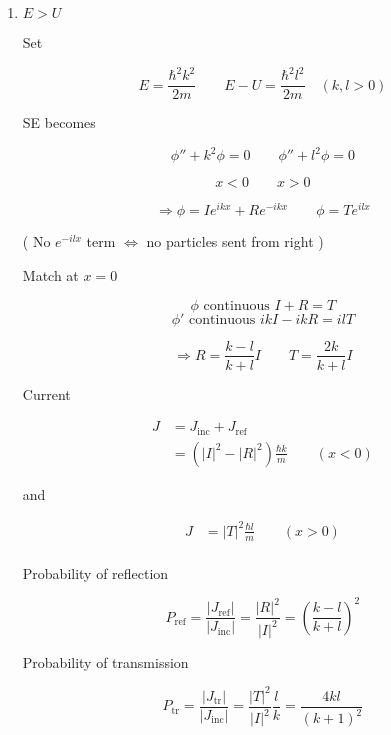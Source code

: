 \documentclass[a4paper]{article}
\begin{document}
	
\begin{enumerate}
	\item $ E > U $
	
	Set 
	
	\[ E = \frac{\hbar^{2} k^{2}}{2m}  \qquad E - U = \frac{\hbar^{2} l^{2}}{2m} \quad (k,l > 0) \]
	
	SE becomes
	
	\[ \phi'' + k^{2} \phi = 0 \qquad  \phi'' + l^{2} \phi = 0 \]
	
	\[ x < 0 \qquad x > 0 \]
	
	\[ \Rightarrow \phi = I e^{ikx} + R e^{-ikx}  \qquad \phi = T e^{ilx}   \]
	
	( No $ e^{-ilx} $ term $ \iff $ no particles sent from right )
	
	Match at $ x = 0 $
	
	\[ \phi \text{ continuous } I + R = T \]
	\[ \phi' \text{ continuous } ik I - i k R = i l T \]
	
	
	\[ \Rightarrow  R = \frac{k-l}{k+l} I \qquad T = \frac{2k}{k+l}I \]
	
	Current
	
	\begin{align*}
	J & = J_{\text{inc}} + J_{\text{ref}} \\
	& = (  | I |^{2} - | R |^{2}  ) \frac{\hbar k}{m}  \qquad (x < 0)
	\end{align*}
	
	
	
	and
	
	\begin{align*}
	J & = | T |^{2}  \frac{\hbar l}{m} \qquad (x > 0) \\
	\end{align*}	
	
	
	Probability of reflection 
	
	\[ P_{\text{ref}} = \frac{| J_{\text{ref}} |}{ | J_{\text{inc}} |} = \frac{|R|^{2}}{| I |^{2}} = \left(  \frac{k-l}{k+l} \right)^{2}  \]
	
	Probability of transmission
	
	\[ P_{\text{tr}} = \frac{| J_{\text{tr}} |}{ | J_{\text{inc}} |} = \frac{| T |^{2}}{| I |^{2}} \frac{l}{k}  = \frac{4kl}{(k+1)^{2}}  \]	
		
		
	\end{enumerate}










  
\end{document}
